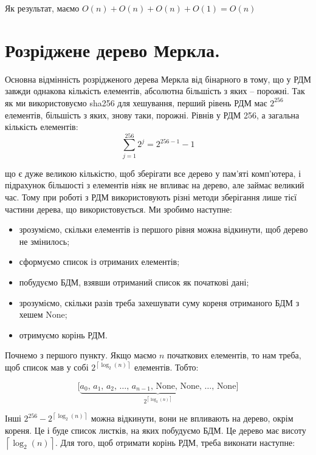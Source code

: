 \documentclass[a4paper, 12pt]{article}
\begin{document}
\par Як результат, маємо $O(n) + O(n) + O(n) + O(1) = O(n)$

\section{Розріджене дерево Меркла.}
\par Основна відмінність розрідженого дерева Меркла від бінарного в тому, що у РДМ завжди однакова кількість елементів, абсолютна більшість з яких -- порожні. Так як ми використовуємо sha256 для хешування, перший рівень РДМ має $2^{256}$ елементів, більшість з яких, знову таки, порожні. Рівнів у РДМ 256, а загальна кількість елементів:
\[\sum_{j = 1}^{256} 2^j = 2^{256 - 1} - 1\]
\par що є дуже великою кількістю, щоб зберігати все дерево у пам'яті комп'ютера, і підрахунок більшості з елементів ніяк не впливає на дерево, але займає великий час. Тому при роботі з РДМ використовують різні методи зберігання лише тієї частини дерева, що використовується. Ми зробимо наступне:

\begin{itemize}
	\item зрозуміємо, скільки елементів із першого рівня можна відкинути, щоб дерево не змінилось;
	\item сформуємо список із отриманих елементів;
	\item побудуємо БДМ, взявши отриманий список як початкові дані;
	\item зрозуміємо, скільки разів треба захешувати суму кореня отриманого БДМ з хешем None;
	\item отримуємо корінь РДМ.
\end{itemize}

\par Почнемо з першого пункту. Якщо маємо $n$ початкових елементів, то нам треба, щоб список мав у собі $2^{\left\lceil \log_2(n)\right\rceil}$ елементів. Тобто:

\[\big[\underbrace{a_0, \, a_1, \, a_2, \, \dots, \, a_{n - 1}, \, \text{None}, \, \text{None}, \, \dots, \, \text{None}}_{2^{\left\lceil\log_2(n)\right\rceil}}\big]\]

\par Інші $2^{256} - 2^{\left\lceil\log_2(n)\right\rceil}$ можна відкинути, вони не впливають на дерево, окрім кореня. Це і буде список листків, на яких побудуємо БДМ. Це дерево має висоту $\left\lceil\log_2(n)\right\rceil$. Для того, щоб отримати корінь РДМ, треба виконати наступне:
\end{document}
